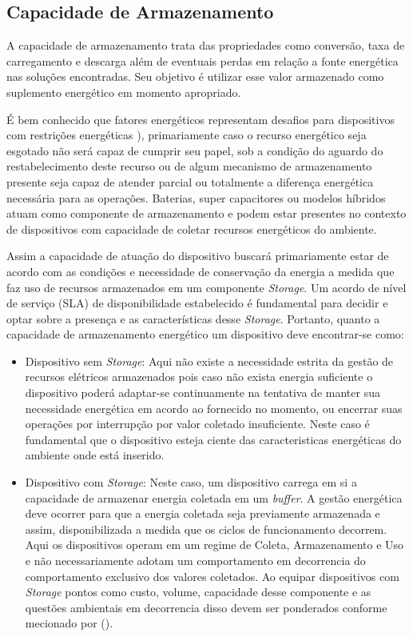 \subsection{Capacidade de Armazenamento}
\label{Capacidade de Armazenamento}
A capacidade de armazenamento trata das propriedades como conversão, taxa de carregamento e descarga além de eventuais perdas em relação a fonte energética nas soluções encontradas. Seu objetivo é utilizar esse valor armazenado como suplemento energético em  momento apropriado. 

É bem conhecido que fatores energéticos representam desafios para dispositivos com restrições energéticas \cite{kansal_power_2007}), primariamente caso o recurso energético seja esgotado não será capaz de cumprir seu papel, sob a condição do aguardo do restabelecimento deste recurso ou de algum mecanismo de armazenamento presente seja capaz de atender parcial ou totalmente a diferença energética necessária para as operações. Baterias, super capacitores ou modelos híbridos atuam como componente de armazenamento e podem estar presentes no contexto de dispositivos com capacidade de coletar recursos energéticos do ambiente.

Assim a capacidade de atuação do dispositivo buscará primariamente estar de acordo com as condições e necessidade de conservação da energia a medida que faz uso de recursos armazenados em um componente \textit{Storage}. Um acordo de nível de serviço (\acl{SLA}) de disponibilidade estabelecido é fundamental para decidir e optar sobre a presença e as características desse \textit{Storage}. Portanto, quanto a capacidade de armazenamento energético um dispositivo deve encontrar-se como: 

\begin{itemize}
    \item Dispositivo sem \textit{Storage}: Aqui não existe a necessidade estrita da gestão de recursos elétricos armazenados pois caso não exista energia suficiente o dispositivo poderá adaptar-se continuamente na tentativa de manter sua necessidade energética em acordo ao fornecido no momento, ou encerrar suas operações por interrupção por valor coletado insuficiente. Neste caso é fundamental que o dispositivo esteja ciente das caracteristicas energéticas do ambiente onde está inserido.
    
    \item Dispositivo com \textit{Storage}: Neste caso, um dispositivo carrega em si a capacidade de armazenar energia coletada em um \textit{buffer}. A gestão energética deve ocorrer para que a energia coletada seja previamente armazenada e assim, disponibilizada a medida que os ciclos de funcionamento decorrem. Aqui os dispositivos operam em um regime de Coleta, Armazenamento e Uso e não necessariamente adotam um comportamento em decorrencia do comportamento exclusivo dos valores coletados. Ao equipar dispositivos com \textit{Storage} pontos como custo, volume, capacidade desse componente e as questões ambientais em decorrencia disso devem ser ponderados conforme mecionado por \citeauthor{merrett_energy-driven_2017}(\citeyear{merrett_energy-driven_2017}).

\end{itemize}

